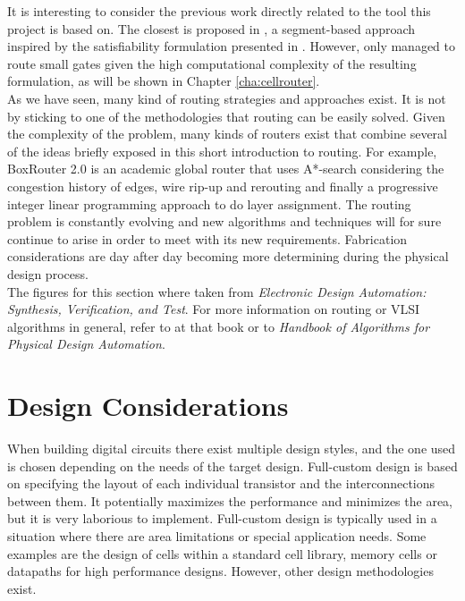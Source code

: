 It is interesting to consider the previous work directly related to the tool this project is based on. The closest is proposed in \cite{set}, a segment-based approach inspired by the satisfiability formulation presented in \cite{vuit}. However, \cite{set} only managed to route small gates given the high computational complexity of the resulting formulation, as will be shown in Chapter \ref{cha:cellrouter}. \\

As we have seen, many kind of routing strategies and approaches exist. It is not by sticking to one of the methodologies that routing can be easily solved. Given the complexity of the problem, many kinds of routers exist that combine several of the ideas briefly exposed in this short introduction to routing. For example, BoxRouter 2.0 \cite{boxrouter} is an academic global router that uses A*-search considering the congestion history of edges, wire rip-up and rerouting and finally a progressive integer linear programming approach to do layer assignment. The routing problem is constantly evolving and new algorithms and techniques will for sure continue to arise in order to meet with its new requirements. Fabrication considerations are day after day becoming more determining during the physical design process. \\

The figures for this section where taken from \textit{Electronic Design Automation: Synthesis, Verification, and Test}\cite{changcheng}. For more information on routing or VLSI algorithms in general, refer to at that book or to \textit{Handbook of Algorithms for Physical Design Automation}\cite{handbook}. \\


\section{Design Considerations}

When building digital circuits there exist multiple design styles, and the one used is chosen depending on the needs of the target design. Full-custom design is based on specifying the layout of each individual transistor and the interconnections between them. It potentially maximizes the performance and minimizes the area, but it is very laborious to implement. Full-custom design is typically used in a situation where there are area limitations or special application needs. Some examples are the design of cells within a standard cell library, memory cells or datapaths for high performance designs. However, other design methodologies exist. \\

